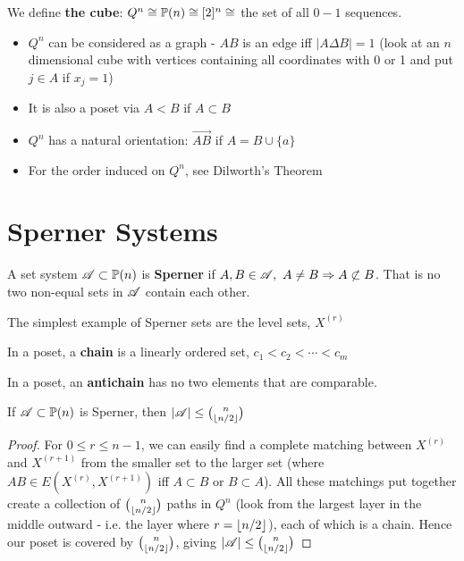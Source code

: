 \documentclass[a4paper]{article}
\begin{document}
{\begin{defi}
	We define \textbf{the cube}: $Q^n\cong\P(n)\cong[2]^n\cong$ the set of all $0-1$ sequences.
\end{defi}
\begin{rem}
	\begin{itemize}
		\item $Q^n$ can be considered as a graph - $AB$ is an edge iff $|A\Delta B|=1$ (look at an $n$ dimensional cube with vertices containing all coordinates with 0 or 1 and put $j\in A$ if $x_j=1$)\\
		\item It is also a poset via $A<B$ if $A\subset B$
		\item $Q^n$ has a natural orientation: $\overrightarrow{AB}$ if $A=B\cup\{a\}$
		\item For the order induced on $Q^n$, see Dilworth's Theorem
	\end{itemize}
\end{rem}

\section{Sperner Systems}
\begin{defi}[Sperner]
	A set system $\A\subset\P(n)$ is \textbf{Sperner} if $A,B\in\A,\ A\neq B\Rightarrow A\not\subset B$. That is no two non-equal sets in $\A$ contain each other.
\end{defi}

The simplest example of Sperner sets are the level sets, $X^{(r)}$

\begin{defi}[Chain]
	In a poset, a \textbf{chain} is a linearly ordered set, $c_1<c_2<\cdots<c_m$
\end{defi}

\begin{defi}[Antichain]
	In a poset, an \textbf{antichain} has no two elements that are comparable.
\end{defi}

\begin{thm-num}[Sperner, 1928]
	If $\A\subset\P(n)$ is Sperner, then $|\A|\leq\binom{n}{\lf n/2\rf}$
\end{thm-num}
\begin{proof}
	For $0\leq r\leq n-1$, we can easily find a complete matching between $X^{(r)}$ and $X^{(r+1)}$ from the smaller set to the larger set (where $AB\in E\left(X^{(r)},X^{(r+1)}\right)$ iff $A\subset B$ or $B\subset A$). All these matchings put together create a collection of $\binom{n}{\lf n/2\rf}$ paths in $Q^n$ (look from the largest layer in the middle outward - i.e. the layer where $r=\lf n/2\rf$), each of which is a chain. Hence our poset is covered by $\binom{n}{\lf n/2\rf}$, giving $|\A|\leq\binom{n}{\lf n/2\rf}$
\end{proof}}
\end{document}
